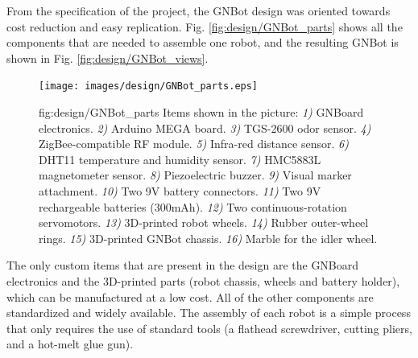 \vspace{-0.5cm}
\vspace{-0.2cm}
From the specification of the project, the GNBot design was oriented towards cost reduction and easy replication.
Fig. \ref{fig:design/GNBot_parts} shows all the components that are needed to assemble one robot, and the resulting GNBot is shown in Fig. \ref{fig:design/GNBot_views}.

\begin{figure}[h!]
\centerline{\mbox{\texttt{[image: images/design/GNBot\_parts.eps]}}}
{fig:design/GNBot_parts}{
Items shown in the picture:
\emph{1)} GNBoard electronics.
\emph{2)} Arduino MEGA board.
\emph{3)} TGS-2600 odor sensor.
\emph{4)} ZigBee-compatible RF module.
\emph{5)} Infra-red distance sensor.
\emph{6)} DHT11 temperature and humidity sensor.
\emph{7)} HMC5883L magnetometer sensor.
\emph{8)} Piezoelectric buzzer.
\emph{9)} Visual marker attachment.
\emph{10)} Two 9V battery connectors.
\emph{11)} Two 9V rechargeable batteries (300mAh).
\emph{12)} Two continuous-rotation servomotors.
\emph{13)} 3D-printed robot wheels.
\emph{14)} Rubber outer-wheel rings.
\emph{15)} 3D-printed GNBot chassis.
\emph{16)} Marble for the idler wheel.
}\end{figure}

The only custom items that are present in the design are the GNBoard electronics and the 3D-printed parts (robot chassis, wheels and battery holder), which can be manufactured at a low cost. All of the other components are standardized and widely available.
The assembly of each robot is a simple process that only requires the use of standard tools (a flathead screwdriver, cutting pliers, and a hot-melt glue gun).

